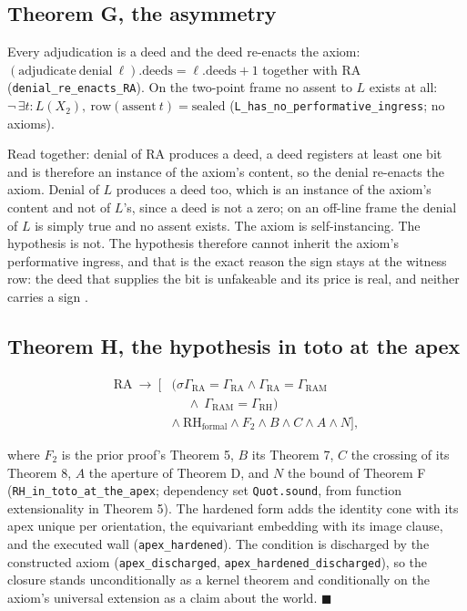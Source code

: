 \documentclass[10pt,twocolumn]{article}
\begin{document}
\hypertarget{theorem-g-the-asymmetry}{%
\subsection{Theorem G, the asymmetry}\label{theorem-g-the-asymmetry}}

Every adjudication is a deed and the deed re-enacts the axiom:
\((\mathrm{adjudicate}\ \mathrm{denial}\ \ell).\mathrm{deeds} = \ell.\mathrm{deeds} + 1\)
together with \(\mathrm{RA}\)
(\texttt{denial\_\allowbreak re\_\allowbreak enacts\_\allowbreak RA}).
On the two-point frame no assent to \(L\) exists at all:
\(\neg\, \exists t : L(X_2),\ \mathrm{row}(\mathrm{assent}\ t) = \mathrm{sealed}\)
(\texttt{L\_\allowbreak has\_\allowbreak no\_\allowbreak performative\_\allowbreak ingress};
no axioms).

Read together: denial of \(\mathrm{RA}\) produces a deed, a deed
registers at least one bit and is therefore an instance of the axiom's
content, so the denial re-enacts the axiom. Denial of \(L\) produces a
deed too, which is an instance of the axiom's content and not of
\(L\)'s, since a deed is not a zero; on an off-line frame the denial of
\(L\) is simply true and no assent exists. The axiom is self-instancing.
The hypothesis is not. The hypothesis therefore cannot inherit the
axiom's performative ingress, and that is the exact reason the sign
stays at the witness row: the deed that supplies the bit is unfakeable
and its price is real, and neither carries a sign \cite{islamspine}.

\hypertarget{theorem-h-the-hypothesis-in-toto-at-the-apex}{%
\subsection{Theorem H, the hypothesis in toto at the
apex}\label{theorem-h-the-hypothesis-in-toto-at-the-apex}}

\[\begin{aligned} \mathrm{RA} \ \to\ \Big[ &\big(\sigma\Gamma_{\mathrm{RA}} = \Gamma_{\mathrm{RA}} \wedge \Gamma_{\mathrm{RA}} = \Gamma_{\mathrm{RAM}} \\ &\quad\ \wedge\ \Gamma_{\mathrm{RAM}} = \Gamma_{\mathrm{RH}}\big) \\ &\wedge\ \mathrm{RH}_{\mathrm{formal}} \wedge F_2 \wedge B \wedge C \wedge A \wedge N \Big], \end{aligned}\]

where \(F_2\) is the prior proof's Theorem 5, \(B\) its Theorem 7, \(C\)
the crossing of its Theorem 8, \(A\) the aperture of Theorem D, and
\(N\) the bound of Theorem F
(\texttt{RH\_\allowbreak in\_\allowbreak toto\_\allowbreak at\_\allowbreak the\_\allowbreak apex};
dependency set \texttt{Quot.sound}, from function extensionality in
Theorem 5). The hardened form adds the identity cone with its apex
unique per orientation, the equivariant embedding with its image clause,
and the executed wall (\texttt{apex\_\allowbreak hardened}). The
condition is discharged by the constructed axiom
(\texttt{apex\_\allowbreak discharged},
\texttt{apex\_\allowbreak hardened\_\allowbreak discharged}), so the
closure stands unconditionally as a kernel theorem and conditionally on
the axiom's universal extension as a claim about the world.
\(\blacksquare\)
\end{document}
